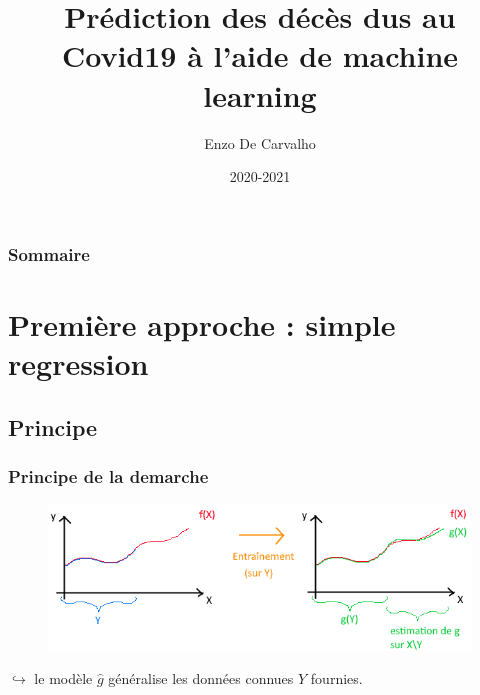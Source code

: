 \documentclass{beamer}[aspectratio = 43]
\title{Prédiction des décès dus au Covid19 à l'aide de machine learning}
\subtitle{}
\author{Enzo De Carvalho}
\institute{numéro d'inscription : 29448}
\date{2020-2021}
\begin{document}
\begin{frame}
	\maketitle
\end{frame}

\begin{frame}
	\frametitle{Sommaire}
	\tableofcontents
\end{frame}

\section{Première approche : simple regression}
\subsection{Principe}
\begin{frame}
	\frametitle{Principe de la demarche}
	\begin{figure}[t]
		\centering
		\includegraphics[scale=0.7]{super_schema}
	\end{figure}
	$\hookrightarrow$ le modèle $\hat{g}$ généralise les données connues $Y$ fournies.
\end{frame}
\end{document}
